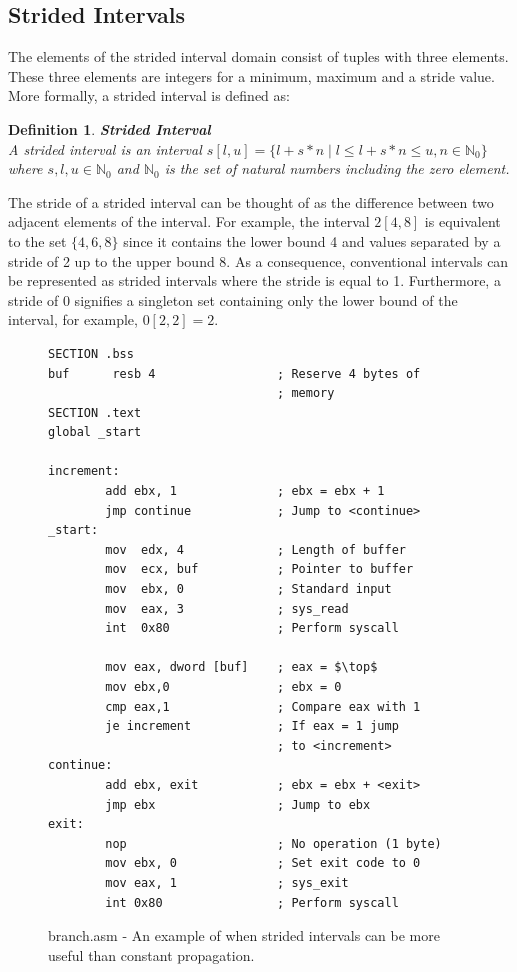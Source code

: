 \documentclass{kththesis}
\newtheorem*{definition}{Definition}
\newcommand{\fbcomment}[1]{{#1}}
\renewcommand{\fbcomment}[1]{}
\begin{document}
\subsection{Strided Intervals}\label{sec:absDomInt}
\fbcomment{\color{red}Goal: Introduce strided intervals and show an example of when it is more useful than constant propagation.}
The elements of the strided interval domain consist of tuples with three elements. These three elements are integers for a minimum, maximum and a stride value. More formally, a strided interval is defined as: 
\begin{definition}\textbf{Strided Interval}\\
A strided interval is an interval $s[l,u]=\{l + s * n\;|\;l \leq l + s * n \leq u, n \in \mathbb{N}_0 \}$ where $s,l,u \in \mathbb{N}_0$ and $\mathbb{N}_0$ is the set of natural numbers including the zero element.
\end{definition}
\noindent The stride of a strided interval can be thought of as the difference between two adjacent elements of the interval. For example, the interval $2[4,8]$ is equivalent to the set $\{4,6,8\}$ since it contains the lower bound 4 and values separated by a stride of 2 up to the upper bound 8. As a consequence, conventional intervals can be represented as strided intervals where the stride is equal to 1. Furthermore, a stride of 0 signifies a singleton set containing only the lower bound of the interval, for example, $0[2,2] = 2$.
\begin{figure}[ht]
    \centering
\begin{tcolorbox}
\begin{verbatim}
SECTION .bss
buf      resb 4                 ; Reserve 4 bytes of
                                ; memory
SECTION .text
global _start

increment:
        add ebx, 1              ; ebx = ebx + 1
        jmp continue            ; Jump to <continue>
_start:
        mov  edx, 4             ; Length of buffer
        mov  ecx, buf           ; Pointer to buffer
        mov  ebx, 0             ; Standard input
        mov  eax, 3             ; sys_read
        int  0x80               ; Perform syscall

        mov eax, dword [buf]    ; eax = $\top$
        mov ebx,0               ; ebx = 0
        cmp eax,1               ; Compare eax with 1
        je increment            ; If eax = 1 jump
                                ; to <increment>
continue:
        add ebx, exit           ; ebx = ebx + <exit>
        jmp ebx                 ; Jump to ebx
exit:
        nop                     ; No operation (1 byte)
        mov ebx, 0              ; Set exit code to 0
        mov eax, 1              ; sys_exit
        int 0x80                ; Perform syscall
\end{verbatim}
\end{tcolorbox}
\caption{branch.asm - An example of when strided intervals can be more useful than constant propagation.}
    \label{fig:branch.asm}
\end{figure}
\end{document}
